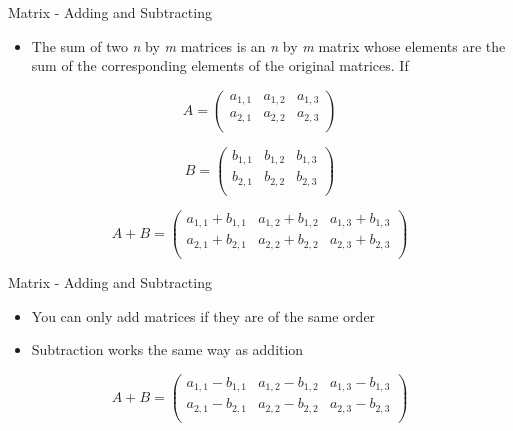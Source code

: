 \documentclass[
  ignorenonframetext,
]{beamer}
\providecommand{\tightlist}{%
  \setlength{\itemsep}{0pt}\setlength{\parskip}{0pt}}
\begin{document}
\begin{frame}{Matrix - Adding and Subtracting}
\protect\hypertarget{matrix---adding-and-subtracting}{}

\begin{itemize}
\tightlist
\item
  The sum of two \emph{n} by \emph{m} matrices is an \emph{n} by
  \emph{m} matrix whose elements are the sum of the corresponding
  elements of the original matrices. If
\end{itemize}

\[A =
 \begin{pmatrix}
  a_{1,1} & a_{1,2} & a_{1,3} \\
  a_{2,1} & a_{2,2} & a_{2,3} \\
 \end{pmatrix}\]

\[B =
 \begin{pmatrix}
  b_{1,1} & b_{1,2} & b_{1,3} \\
  b_{2,1} & b_{2,2} & b_{2,3} \\
 \end{pmatrix}\]

\[A+B =
 \begin{pmatrix}
  a_{1,1} + b_{1,1} & a_{1,2} + b_{1,2} & a_{1,3} + b_{1,3} \\
  a_{2,1} +  b_{2,1} & a_{2,2} + b_{2,2} & a_{2,3} + b_{2,3}\\
 \end{pmatrix}\]

\end{frame}

\begin{frame}{Matrix - Adding and Subtracting}
\protect\hypertarget{matrix---adding-and-subtracting-1}{}

\begin{itemize}
\item
  You can only add matrices if they are of the same order
\item
  Subtraction works the same way as addition
\end{itemize}

\[A+B =
 \begin{pmatrix}
  a_{1,1} - b_{1,1} & a_{1,2} - b_{1,2} & a_{1,3} - b_{1,3} \\
  a_{2,1} -  b_{2,1} & a_{2,2} - b_{2,2} & a_{2,3} - b_{2,3}\\
 \end{pmatrix}\]

\end{frame}
\end{document}
